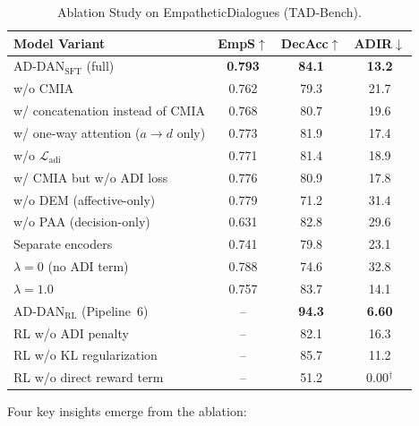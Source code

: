 \documentclass[lettersize,journal]{IEEEtran}
\begin{document}
\begin{table}[!t]
\centering
\caption{Ablation Study on EmpatheticDialogues (TAD-Bench).}
\label{tab:ablation}
\renewcommand{\arraystretch}{1.15}
\begin{tabular}{lccc}
\toprule
\textbf{Model Variant} & EmpS$\uparrow$ & DecAcc$\uparrow$ & ADIR$\downarrow$ \\
\midrule
AD-DAN$_\mathrm{SFT}$ (full)               & \textbf{0.793} & \textbf{84.1} & \textbf{13.2} \\
\;\;w/o CMIA                               & 0.762 & 79.3 & 21.7 \\
\;\;w/ concatenation instead of CMIA      & 0.768 & 80.7 & 19.6 \\
\;\;w/ one-way attention ($a\!\to\!d$ only) & 0.773 & 81.9 & 17.4 \\
\;\;w/o $\mathcal{L}_\mathrm{adi}$         & 0.771 & 81.4 & 18.9 \\
\;\;w/ CMIA but w/o ADI loss               & 0.776 & 80.9 & 17.8 \\
\;\;w/o DEM (affective-only)              & 0.779 & 71.2 & 31.4 \\
\;\;w/o PAA (decision-only)              & 0.631 & 82.8 & 29.6 \\
\;\;Separate encoders                    & 0.741 & 79.8 & 23.1 \\
\;\;$\lambda{=}0$ (no ADI term)          & 0.788 & 74.6 & 32.8 \\
\;\;$\lambda{=}1.0$                      & 0.757 & 83.7 & 14.1 \\
\midrule
AD-DAN$_\mathrm{RL}$ (Pipeline~6)    & -- & \textbf{94.3} & \textbf{6.60} \\
\;\;RL w/o ADI penalty               & -- & 82.1 & 16.3 \\
\;\;RL w/o KL regularization         & -- & 85.7 & 11.2 \\
\;\;RL w/o direct reward term        & -- & 51.2 & 0.00$^\dagger$ \\
\bottomrule
\end{tabular}
\end{table}
\vspace{-2pt}
\vspace{2pt}

Four key insights emerge from the ablation:
\end{document}
